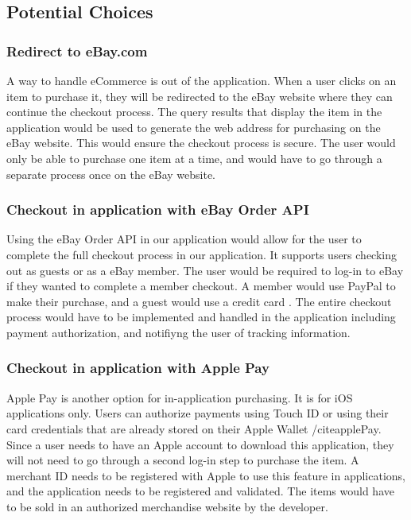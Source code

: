\documentclass[onecolumn, draftclsnofoot,10pt, compsoc]{IEEEtran}
\begin{document}
\subsection{Potential Choices}

\subsubsection{Redirect to eBay.com}
A way to handle eCommerce is out of the application. When a user clicks on an item to purchase it, they will be redirected to the eBay website where they can continue the checkout process. The query results that display the item in the application would be used to generate the web address for purchasing on the eBay website. This would ensure the checkout process is secure. The user would only be able to purchase one item at a time, and would have to go through a separate process once on the eBay website.

\subsubsection{Checkout in application with eBay Order API}
Using the eBay Order API in our application would allow for the user to complete the full checkout process in our application. It supports users checking out as guests or as a eBay member. The user would be required to log-in to eBay if they wanted to complete a member checkout. A member would use PayPal to make their purchase, and a guest would use a credit card \cite{ebayOrderAPI}. The entire checkout process would have to be implemented and handled in the application including payment authorization, and notifiyng the user of tracking information.

\subsubsection{Checkout in application with Apple Pay}
Apple Pay is another option for in-application purchasing. It is for iOS applications only. Users can authorize payments using Touch ID or using their card credentials that are already stored on their Apple Wallet /cite{applePay}. Since a user needs to have an Apple account to download this application, they will not need to go through a second log-in step to purchase the item. A merchant ID needs to be registered with Apple to use this feature in applications, and the application needs to be registered and validated. The items would have to be sold in an authorized merchandise website by the developer. 
\end{document}
